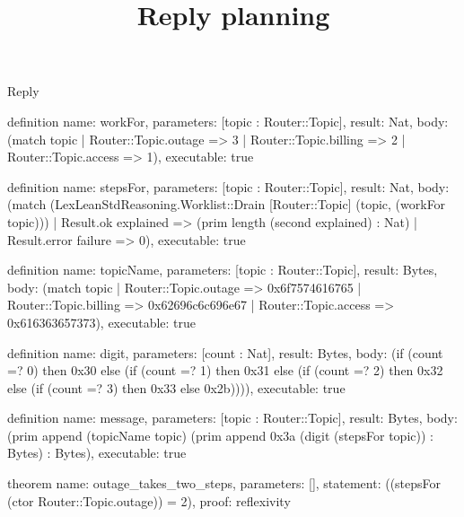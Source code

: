 \begin{lexlean}{Reply}
\title{Reply planning}
\begin{semanticmodule}
definition{
  name: workFor,
  parameters: [topic : Router::Topic],
  result: Nat,
  body: (match topic
    | Router::Topic.outage => 3
    | Router::Topic.billing => 2
    | Router::Topic.access => 1),
  executable: true
}

definition{
  name: stepsFor,
  parameters: [topic : Router::Topic],
  result: Nat,
  body: (match (LexLeanStdReasoning.Worklist::Drain [Router::Topic] (topic, (workFor topic)))
    | Result.ok explained => (prim length (second explained) : Nat)
    | Result.error failure => 0),
  executable: true
}

definition{
  name: topicName,
  parameters: [topic : Router::Topic],
  result: Bytes,
  body: (match topic
    | Router::Topic.outage => 0x6f7574616765
    | Router::Topic.billing => 0x62696c6c696e67
    | Router::Topic.access => 0x616363657373),
  executable: true
}

definition{
  name: digit,
  parameters: [count : Nat],
  result: Bytes,
  body: (if (count =? 0) then 0x30 else (if (count =? 1) then 0x31 else (if (count =? 2) then 0x32 else (if (count =? 3) then 0x33 else 0x2b)))),
  executable: true
}

definition{
  name: message,
  parameters: [topic : Router::Topic],
  result: Bytes,
  body: (prim append (topicName topic) (prim append 0x3a (digit (stepsFor topic)) : Bytes) : Bytes),
  executable: true
}

theorem{
  name: outage_takes_two_steps,
  parameters: [],
  statement: ((stepsFor (ctor Router::Topic.outage)) = 2),
  proof: reflexivity{}
}
\end{semanticmodule}
\end{lexlean}
